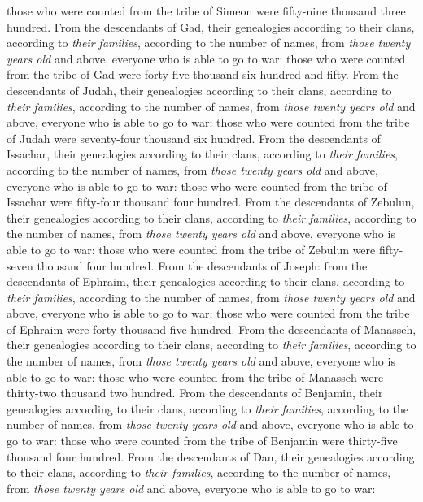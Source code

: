 \begin{biblechapter}
\verse those who were counted from the tribe of Simeon were fifty-nine thousand three hundred.
\verse From the descendants of Gad, their genealogies according to their clans, according to \textit{their families}, according to the number of names, from \textit{those twenty years old} and above, everyone who is able to go to war:
\verse those who were counted from the tribe of Gad were forty-five thousand six hundred and fifty.
\verse From the descendants of Judah, their genealogies according to their clans, according to \textit{their families}, according to the number of names, from \textit{those twenty years old} and above, everyone who is able to go to war:
\verse those who were counted from the tribe of Judah were seventy-four thousand six hundred.
\verse From the descendants of Issachar, their genealogies according to their clans, according to \textit{their families}, according to the number of names, from \textit{those twenty years old} and above, everyone who is able to go to war:
\verse those who were counted from the tribe of Issachar were fifty-four thousand four hundred.
\verse From the descendants of Zebulun, their genealogies according to their clans, according to \textit{their families}, according to the number of names, from \textit{those twenty years old} and above, everyone who is able to go to war:
\verse those who were counted from the tribe of Zebulun were fifty-seven thousand four hundred.
\verse From the descendants of Joseph: from the descendants of Ephraim, their genealogies according to their clans, according to \textit{their families}, according to the number of names, from \textit{those twenty years old} and above, everyone who is able to go to war:
\verse those who were counted from the tribe of Ephraim were forty thousand five hundred.
\verse From the descendants of Manasseh, their genealogies according to their clans, according to \textit{their families}, according to the number of names, from \textit{those twenty years old} and above, everyone who is able to go to war:
\verse those who were counted from the tribe of Manasseh were thirty-two thousand two hundred.
\verse From the descendants of Benjamin, their genealogies according to their clans, according to \textit{their families}, according to the number of names, from \textit{those twenty years old} and above, everyone who is able to go to war:
\verse those who were counted from the tribe of Benjamin were thirty-five thousand four hundred.
\verse From the descendants of Dan, their genealogies according to their clans, according to \textit{their families}, according to the number of names, from \textit{those twenty years old} and above, everyone who is able to go to war:

\end{biblechapter}
